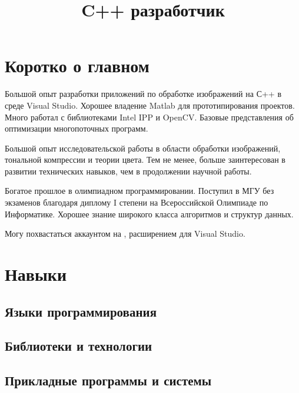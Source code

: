 \documentclass[11pt,a4paper,final]{moderncv}
\title{C++ разработчик}                               %
\begin{document}
\maketitle

\section{Коротко о главном}

Большой опыт разработки приложений по обработке изображений на С++ в среде Visual Studio. Хорошее владение Matlab для прототипирования проектов. Много работал с библиотеками Intel IPP и OpenCV. Базовые представления об оптимизации многопоточных программ.

Большой опыт исследовательской работы в области обработки изображений, тональной компрессии и теории цвета. Тем не менее, больше заинтересован в развитии технических навыков, чем в продолжении научной работы.

Богатое прошлое в олимпиадном программировании. Поступил в МГУ без экзаменов благодаря диплому I степени на Всероссийской Олимпиаде по Информатике. Хорошее знание широкого класса алгоритмов и структур данных.

Могу похвастаться аккаунтом на , расширением  для Visual Studio.

\section{Навыки}

\subsection{Языки программирования}


\subsection{Библиотеки и технологии}


\subsection{Прикладные программы и системы}
\end{document}
